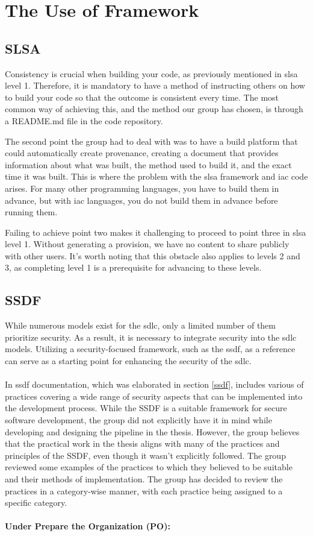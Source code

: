 \section{The Use of Framework}
\subsection{SLSA}

Consistency is crucial when building your code, as previously mentioned in \acrshort{slsa} level 1. Therefore, it is mandatory to have a method of instructing others on how to build your code so that the outcome is consistent every time. The most common way of achieving this, and the method our group has chosen, is through a README.md file in the code repository. 

The second point the group had to deal with was to have a build platform that could automatically create \gls{provenance}, creating a document that provides information about what was built, the method used to build it, and the exact time it was built. This is where the problem with the \acrshort{slsa} framework and \acrshort{iac} code arises. For many other programming languages, you have to build them in advance, but with \acrshort{iac} languages, you do not build them in advance before running them.

Failing to achieve point two makes it challenging to proceed to point three in \acrshort{slsa} level 1. Without generating a provision, we have no content to share publicly with other users. It's worth noting that this obstacle also applies to levels 2 and 3, as completing level 1 is a prerequisite for advancing to these levels.

\subsection{SSDF}
While numerous models exist for the \acrlong{sdlc}, only a limited number of them prioritize security. As a result, it is necessary to integrate security into the \acrshort{sdlc} models. Utilizing a security-focused framework, such as the \acrshort{ssdf}, as a reference can serve as a starting point for enhancing the security of the \acrshort{sdlc}. 
\\~\\
In \acrshort{ssdf} documentation, which was elaborated in section \ref{ssdf}, includes various of  practices covering a wide range of security aspects that can be implemented into the development process. While the SSDF is a suitable framework for secure software development, the group did not explicitly have it in mind while developing and designing the pipeline in the thesis. However, the group believes that the practical work in the thesis aligns with many of the practices and principles of the SSDF, even though it wasn't explicitly followed. The group reviewed some examples of the practices to which they believed to be suitable and their methods of implementation. The group has decided to review the practices in a category-wise manner, with each practice being assigned to a specific category. 
\\~\\
\textbf{Under Prepare the Organization (PO):}

